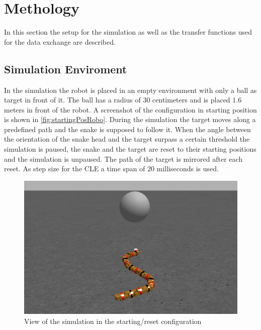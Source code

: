 
\chapter{Methology}\label{chapter:Methology}
In this section the setup for the simulation as well as the transfer functions used for the data exchange are described.

\section{Simulation Enviroment}
In the simulation the robot is placed in an empty environment with only a ball as target in front of it. The ball has a radius of $30$ centimeters and is placed $1.6$ meters in front of the robot. A screenshot of the configuration in starting position is shown in \autoref{fig:startingPosRobo}. During the simulation the target moves along a predefined path and the snake is supposed to follow it. When the angle between the orientation of the snake head and the target surpass a certain threshold the simulation is paused, the snake and the target are reset to their starting positions and the simulation is unpaused. The path of the target is mirrored after each reset. As step size for the CLE a time span of $20$ milliseconds is used.

\begin{figure}[htpb]
  \centering
  \includegraphics[width=\textwidth]{figures/startingPosition.png}
  \caption{View of the simulation in the starting/reset configuration }
  \label{fig:startingPosRobo}
\end{figure}



